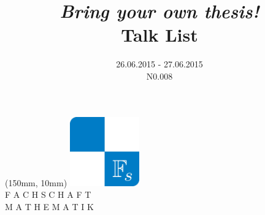\documentclass[12pt, a4paper, english]{article}
\title{\emph{Bring your own thesis!} \\ Talk List}
\date{26.06.2015 - 27.06.2015 \\ N0.008}
\begin{document}
\maketitle

\begin{textblock*}{50mm}(150mm, 10mm)
\includegraphics[width=30mm]{fs}\\
        \small
        F A C H S C H A F T\\
        M A T H E M A T I K
\end{textblock*}


\end{document}
